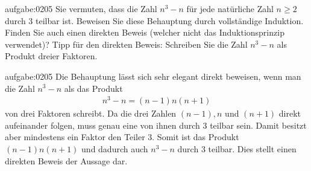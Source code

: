 \begin{aufgabe}{aufgabe:0205}
Sie vermuten, dass die Zahl $n^3-n$ für jede natürliche Zahl $n\geq 2$ durch $3$ teilbar ist. Beweisen Sie diese Behauptung durch vollständige Induktion. Finden Sie auch einen direkten Beweis (welcher nicht das Induktionsprinzip verwendet)? Tipp für den direkten Beweis: Schreiben Sie die Zahl $n^3-n$ als Produkt dreier Faktoren.
\end{aufgabe}

\begin{antwort}{aufgabe:0205}
Die Behauptung lässt sich sehr elegant direkt beweisen, wenn man die Zahl $n^3-n$ als das Produkt
\begin{align*}
    n^3-n = (n-1)n(n+1)
\end{align*}
von drei Faktoren schreibt. Da die drei Zahlen $(n-1), n$ und $(n+1)$ direkt aufeinander folgen, muss genau eine von ihnen durch $3$ teilbar sein. Damit besitzt aber mindestens ein Faktor den Teiler $3$. Somit ist das Produkt $(n-1)n(n+1)$ und dadurch auch $n^3-n$ durch $3$ teilbar. Dies stellt einen direkten Beweis der Aussage dar.


\end{antwort}
